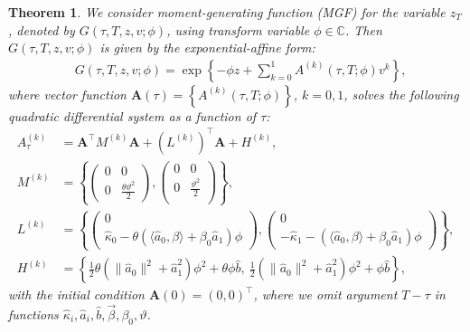 \documentclass[pdftex,11pt,a4paper] {article}
\newtheorem{theorem}{Theorem}[section]
\begin{document}
\begin{theorem}\label{thm:mgf_cir_gen} We consider moment-generating function (MGF) for the variable $z_{T}$, denoted by $G(\tau, T, z,v; \phi)$, using transform variable $\phi\in \mathbb{C}$. Then $G(\tau, T, z,v; \phi)$ is given by the exponential-affine form: 
\begin{equation}\label{eq:mgf_cir_gen}
\begin{split}
& G(\tau, T, z,v; \phi)= \exp \left\{-\phi z+  \sum^{1}_{k=0}A^{(k)}(\tau,T;\phi)v^{k}  \right\},
\end{split}
\end{equation}
where vector function $\mathbf{A}(\tau)=\left\{A^{(k)}(\tau,T;\phi)\right\}$, $k=0,1$, solves the following quadratic differential system as a function of $\tau$:
\begin{equation}\label{eq:mgf_cir_gen_ode}
\begin{split}
A^{(k)}_\tau&=\mathbf{A}^\top M^{(k)}\mathbf{A} + \left(L^{(k)}\right)^\top \mathbf{A} + H^{(k)},\\
M^{(k)}&=\left\{
\begin{pmatrix} %
0 & 0  \\
0 & \frac{\theta\vartheta^2}{2} 
\end{pmatrix}, 
\begin{pmatrix} %
0 & 0 \\
0 & \frac{\vartheta^2}{2} \\
\end{pmatrix} 
\right\},\\
L^{(k)}&=\left\{\begin{pmatrix} %
0 \\ \hat\kappa_0-\theta(\langle \hat a_0, \beta\rangle+\beta_0 \hat a_1) \phi 
\end{pmatrix},
\begin{pmatrix} %
0 \\ -\hat\kappa_1-(\langle \hat a_0, \beta\rangle+\beta_0 \hat a_1) \phi 
\end{pmatrix}
\right\},\\
H^{(k)}&=\left\{
\frac{1}{2}\theta (\|\hat a_0\|^2+\hat a_1^2)\phi^2+\theta\phi \hat b, \
\frac{1}{2}  (\|\hat a_0\|^2+\hat a_1^2)\phi^2 + \phi \hat b \right\},
\end{split}
\end{equation}
with the initial condition $\mathbf{A}(0)=( 0, 0)^\top$, where we omit argument $T-\tau$ in functions $\hat\kappa_i, \hat a_i, \hat b, \vec\beta, \beta_0, \vartheta$. 
\end{theorem}
\end{document}
